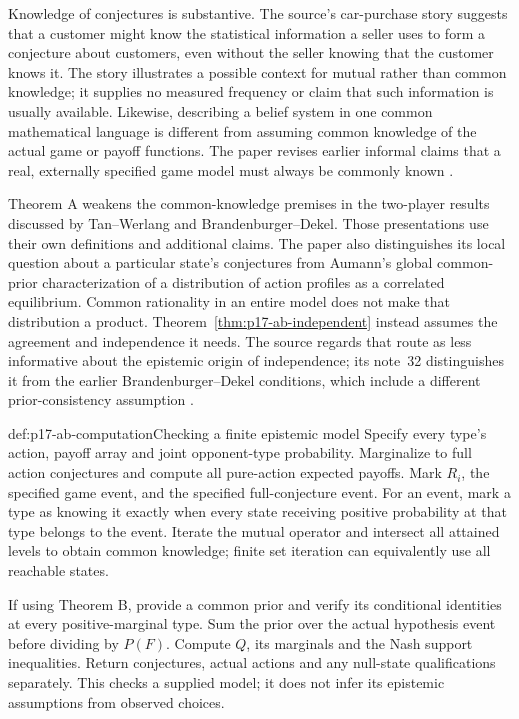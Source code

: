 Knowledge of conjectures is substantive. The source's car-purchase
story suggests that a customer might know the statistical information
a seller uses to form a conjecture about customers, even without the
seller knowing that the customer knows it. The story illustrates a
possible context for mutual rather than common knowledge; it supplies
no measured frequency or claim that such information is usually available.
Likewise, describing a belief system in one common mathematical
language is different from assuming common knowledge of the actual
game or payoff functions. The paper revises earlier informal claims
that a real, externally specified game model must always be commonly
known \parencite[pp.~1176--1177]{AumannBrandenburger1995Epistemic}.

Theorem A weakens the common-knowledge premises in the two-player
results discussed by Tan--Werlang and Brandenburger--Dekel. Those
presentations use their own definitions and additional claims.
The paper also distinguishes its local question about a particular
state's conjectures from Aumann's global common-prior characterization
of a distribution of action profiles as a correlated equilibrium.
Common rationality in an entire model does not make that distribution
a product. Theorem~\ref{thm:p17-ab-independent} instead assumes the
agreement and independence it needs. The source regards that route as
less informative about the epistemic origin of independence; its
note~32 distinguishes it from the earlier Brandenburger--Dekel
conditions, which include a different prior-consistency assumption
\parencite[pp.~1177--1179]{AumannBrandenburger1995Epistemic}.

\begin{hbmethod}{def:p17-ab-computation}{Checking a finite epistemic model}
Specify every type's action, payoff array and joint opponent-type
probability. Marginalize to full action conjectures and compute all
pure-action expected payoffs. Mark \(R_i\), the specified game event,
and the specified full-conjecture event. For an event, mark a type
as knowing it exactly when every state receiving positive probability
at that type belongs to the event. Iterate the mutual operator and
intersect all attained levels to obtain common knowledge; finite
set iteration can equivalently use all reachable states.

If using Theorem B, provide a common prior and verify its conditional
identities at every positive-marginal type. Sum the prior over the
actual hypothesis event before dividing by \(P(F)\). Compute \(Q\),
its marginals and the Nash support inequalities. Return conjectures,
actual actions and any null-state qualifications separately.
This checks a supplied model; it does not infer its epistemic
assumptions from observed choices.
\end{hbmethod}

